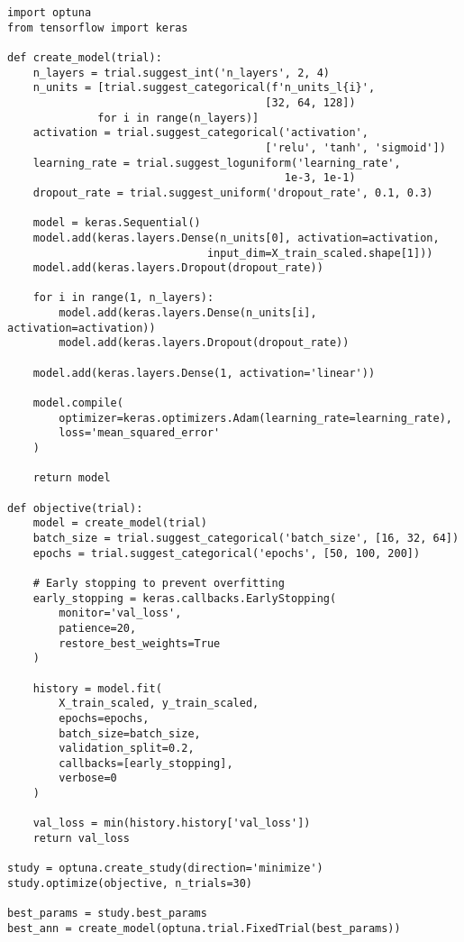 \documentclass[12pt]{article}
\begin{document}
\begin{verbatim}
import optuna
from tensorflow import keras

def create_model(trial):
    n_layers = trial.suggest_int('n_layers', 2, 4)
    n_units = [trial.suggest_categorical(f'n_units_l{i}', 
                                        [32, 64, 128]) 
              for i in range(n_layers)]
    activation = trial.suggest_categorical('activation', 
                                        ['relu', 'tanh', 'sigmoid'])
    learning_rate = trial.suggest_loguniform('learning_rate', 
                                           1e-3, 1e-1)
    dropout_rate = trial.suggest_uniform('dropout_rate', 0.1, 0.3)
    
    model = keras.Sequential()
    model.add(keras.layers.Dense(n_units[0], activation=activation, 
                               input_dim=X_train_scaled.shape[1]))
    model.add(keras.layers.Dropout(dropout_rate))
    
    for i in range(1, n_layers):
        model.add(keras.layers.Dense(n_units[i], activation=activation))
        model.add(keras.layers.Dropout(dropout_rate))
    
    model.add(keras.layers.Dense(1, activation='linear'))
    
    model.compile(
        optimizer=keras.optimizers.Adam(learning_rate=learning_rate),
        loss='mean_squared_error'
    )
    
    return model

def objective(trial):
    model = create_model(trial)
    batch_size = trial.suggest_categorical('batch_size', [16, 32, 64])
    epochs = trial.suggest_categorical('epochs', [50, 100, 200])
    
    # Early stopping to prevent overfitting
    early_stopping = keras.callbacks.EarlyStopping(
        monitor='val_loss',
        patience=20,
        restore_best_weights=True
    )
    
    history = model.fit(
        X_train_scaled, y_train_scaled,
        epochs=epochs,
        batch_size=batch_size,
        validation_split=0.2,
        callbacks=[early_stopping],
        verbose=0
    )
    
    val_loss = min(history.history['val_loss'])
    return val_loss

study = optuna.create_study(direction='minimize')
study.optimize(objective, n_trials=30)

best_params = study.best_params
best_ann = create_model(optuna.trial.FixedTrial(best_params))
\end{verbatim}
\end{document}
